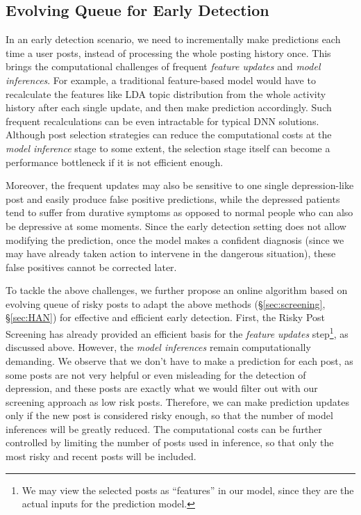 \subsection{Evolving Queue for Early Detection}
\label{sec:evolving}

In an early detection scenario, we need to incrementally make predictions each time a user posts, instead of processing the whole posting history once.
This brings the computational challenges of frequent \textit{feature updates} and \textit{model inferences}. For example, a traditional feature-based model would have to recalculate the features like LDA topic distribution \citep{blei2003latent} from the whole activity history after each single update, and then make prediction accordingly. Such frequent recalculations can be even intractable for typical DNN solutions. Although post selection strategies can reduce the computational costs at the \textit{model inference} stage to some extent, the selection stage itself can become a performance bottleneck if it is not efficient enough. 

Moreover, the frequent updates may also be sensitive to one single depression-like post and easily produce false positive predictions, while the depressed patients tend to suffer from durative symptoms  \citep{kroenke2001phq} as opposed to normal people who can also be depressive at some moments. Since the early detection setting does not allow modifying the prediction, once the model makes a confident diagnosis (since we may have already taken action to intervene in the dangerous situation), these false positives cannot be corrected later.

To tackle the above challenges, we further propose an online algorithm based on evolving queue of risky posts to adapt the above methods (\S \ref{sec:screening}, \S \ref{sec:HAN}) for effective and efficient early detection. First, the Risky Post Screening has already provided an efficient basis for the \textit{feature updates} step\footnote{We may view the selected posts as ``features'' in our model, since they are the actual inputs for the prediction model.}, as discussed above. However, the \textit{model inferences} remain computationally demanding. We observe that we don't have to make a prediction for each post, as some posts are not very helpful or even misleading for the detection of depression, and these posts are exactly what we would filter out with our screening approach as low risk posts. 
Therefore, we can make prediction updates only if the new post is considered risky enough, so that the number of model inferences will be greatly reduced. The computational costs can be further controlled by limiting the number of posts used in inference, so that only the most risky and recent posts will be included.

